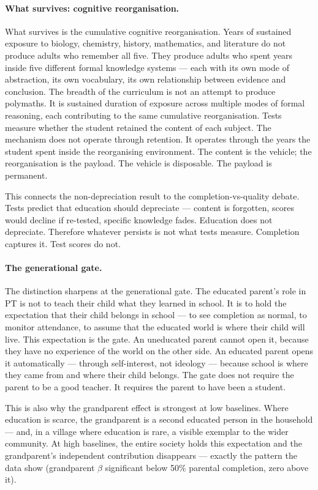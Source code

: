\documentclass[12pt,letterpaper]{article}
\begin{document}
\paragraph{What survives: cognitive reorganisation.}

What survives is the cumulative cognitive reorganisation. Years of
sustained exposure to biology, chemistry, history, mathematics, and
literature do not produce adults who remember all five. They produce
adults who spent years inside five different formal knowledge systems ---
each with its own mode of abstraction, its own vocabulary, its own
relationship between evidence and conclusion. The breadth of the
curriculum is not an attempt to produce polymaths. It is sustained
duration of exposure across multiple modes of formal reasoning, each
contributing to the same cumulative reorganisation. Tests measure whether
the student retained the content of each subject. The mechanism does not
operate through retention. It operates through the years the student
spent inside the reorganising environment. The content is the vehicle;
the reorganisation is the payload. The vehicle is disposable. The payload
is permanent.

This connects the non-depreciation result to the completion-vs-quality
debate. Tests predict that education should depreciate --- content is
forgotten, scores would decline if re-tested, specific knowledge fades.
Education does not depreciate. Therefore whatever persists is not what
tests measure. Completion captures it. Test scores do not.

\paragraph{The generational gate.}

The distinction sharpens at the generational gate. The educated parent's
role in PT is not to teach their child what they learned in school. It is
to hold the expectation that their child belongs in school --- to see
completion as normal, to monitor attendance, to assume that the educated
world is where their child will live. This expectation is the gate. An
uneducated parent cannot open it, because they have no experience of the
world on the other side. An educated parent opens it automatically ---
through self-interest, not ideology --- because school is where they came
from and where their child belongs. The gate does not require the parent
to be a good teacher. It requires the parent to have been a student.

This is also why the grandparent effect is strongest at low baselines.
Where education is scarce, the grandparent is a second educated person
in the household --- and, in a village where education is rare, a visible
exemplar to the wider community. At high baselines, the entire society
holds this expectation and the grandparent's independent contribution
disappears --- exactly the pattern the data show (grandparent $\beta$
significant below 50\% parental completion, zero above it).
\end{document}
